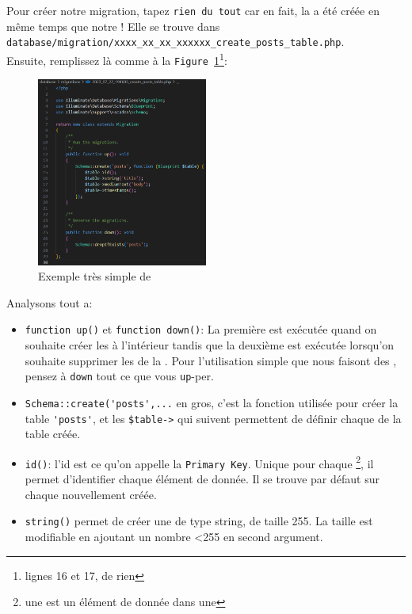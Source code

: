 \documentclass[internal]{nhitec_design}
\begin{document}
Pour créer notre migration, tapez \verb|rien du tout| car en fait, la \migration{} a été créée en même temps que notre \model{}! Elle se trouve dans \\\verb|database/migration/xxxx_xx_xx_xxxxxx_create_posts_table.php|. \\Ensuite, remplissez là comme à la \texttt{Figure~\ref{fig:basic_migration}}\footnote{lignes 16 et 17, de rien}:

\begin{figure}
    \vspace{-0.5cm}
    \includegraphics[width=0.5\textwidth]{figures-C1/post_migration.pdf}
    \caption{Exemple très simple de \migration{}\label{fig:basic_migration}}
\end{figure}

Analysons tout a:
\begin{itemize}
    \item \verb|function up()| et \verb|function down()|: La première est exécutée quand on souhaite créer les \tables{} à l'intérieur tandis que la deuxième est exécutée lorsqu'on souhaite supprimer les \tables{} de la \db{}. Pour l'utilisation simple que nous faisont des \migrations{}, pensez à \verb|down| tout ce que vous \verb|up|-per.

    \item \verb|Schema::create('posts',...| en gros, c'est la fonction utilisée pour créer la table \verb|'posts'|, et les \verb|$table->| qui suivent permettent de définir chaque \column{} de la table créée.

    \item \verb|id()|: l'id est ce qu'on appelle la \texttt{Primary Key}. Unique pour chaque \row{}\footnote{une \row{} est un élément de donnée dans une \table{}}, il permet d'identifier chaque élément de donnée. Il se trouve par défaut sur chaque \table{} nouvellement créée.
    \item \verb|string()| permet de créer une \column{} de type string, de taille 255. La taille est modifiable en ajoutant un nombre <255 en second argument.
\end{itemize}
\end{document}
